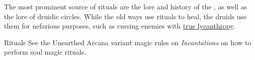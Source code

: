 The most prominent source of rituals are the lore and history of the
, as well as the lore of druidic circles. While the old
ways use rituals to heal, the druids use them for nefarious purposes, such as
cursing enemies with \hyperref[sec:True Lycanthropes]{true lycanthropy}.

\begin{35e}{Rituals}
  See the Unearthed Arcana variant magic rules on \emph{Incantations} on how
  to perform soul magic rituals.
\end{35e}



